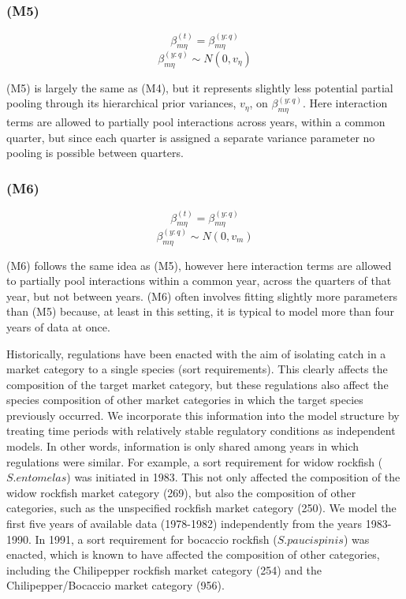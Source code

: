 \documentclass[12pt]{article}
\begin{document}

\subsubsection{(M5)}\label{m5}

\[\beta^{(t)}_{m\eta} = \beta^{(y:q)}_{m\eta}\]
\[\beta^{(y:q)}_{m\eta} \sim N(0, v_\eta)\]

(M5) is largely the same as (M4), but it represents slightly less
potential partial pooling through its hierarchical prior variances,
\(v_\eta\), on \(\beta^{(y:q)}_{m\eta}\). Here interaction terms are
allowed to partially pool interactions across years, within a common
quarter, but since each quarter is assigned a separate variance
parameter no pooling is possible between quarters.

\subsubsection{(M6)}\label{m6}

\[\beta^{(t)}_{m\eta} = \beta^{(y:q)}_{m\eta}\]
\[\beta^{(y:q)}_{m\eta} \sim N(0, v_m)\]

(M6) follows the same idea as (M5), however here interaction terms are
allowed to partially pool interactions within a common year, across the
quarters of that year, but not between years. (M6) often involves
fitting slightly more parameters than (M5) because, at least in this
setting, it is typical to model more than four years of data at once.

Historically, regulations have been enacted with the aim of isolating
catch in a market category to a single species (sort requirements). This
clearly affects the composition of the target market category, but these
regulations also affect the species composition of other market
categories in which the target species previously occurred. We
incorporate this information into the model structure by treating time
periods with relatively stable regulatory conditions as independent
models. In other words, information is only shared among years in which
regulations were similar. For example, a sort requirement for widow
rockfish ($S. entomelas$) was initiated in 1983. This not only affected
the composition of the widow rockfish market category (269), but also
the composition of other categories, such as the unspecified rockfish
market category (250). We model the first five years of available data
(1978-1982) independently from the years 1983-1990. In 1991, a sort
requirement for bocaccio rockfish ($S. paucispinis$) was enacted, which is
known to have affected the composition of other categories, including the 
Chilipepper rockfish market category (254) and the Chilipepper/Bocaccio market 
category (956).
\end{document}
